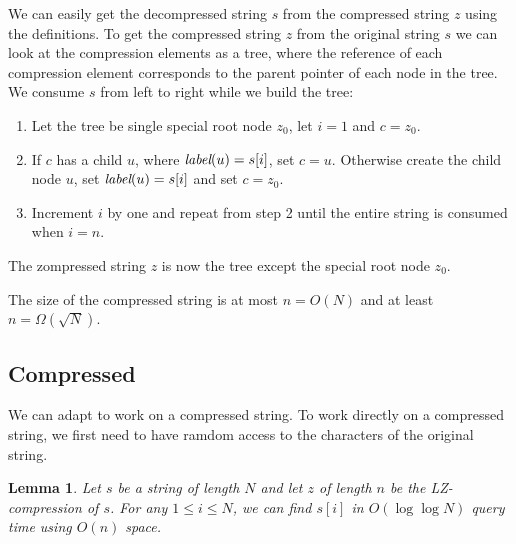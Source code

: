 \documentclass[a4]{article}
\newtheorem{lemma}{Lemma}
\begin{document}
We can easily get the decompressed string $s$ from the compressed string $z$ using the definitions. To get the compressed string $z$ from the original string $s$ we can look at the compression elements as a tree, where the reference of each compression element corresponds to the parent pointer of each node in the tree. We consume $s$ from left to right while we build the tree:
\begin{enumerate}
\item Let the tree be single special root node $z_0$, let $i = 1$ and $c=z_0$.
\item If $c$ has a child $u$, where $\textit{label}(u)=s[i]$, set $c=u$. Otherwise create the child node $u$, set $\textit{label}(u)=s[i]$ and set $c=z_0$.
\item Increment $i$ by one and repeat from step 2 until the entire string is consumed when $i = n$.
\end{enumerate}
The zompressed string $z$ is now the tree except the special root node $z_0$.

The size of the compressed string is at most $n=O(N)$ and at least $n=\Omega(\sqrt{N})$.

\subsection{Compressed \label{sec:lz-iterate-forward}}

We can adapt  to work on a compressed string. To work directly on a compressed string, we first need to have ramdom access to the characters of the original string.

\begin{lemma}
\label{lem:lz-random-access}
Let $s$ be a string of length $N$ and let $z$ of length $n$ be the LZ-compression of $s$. For any $1 \leq i \leq N$, we can find $s[i]$ in $O(\log\log N)$ query time using $O(n)$ space.
\end{lemma}
\end{document}
